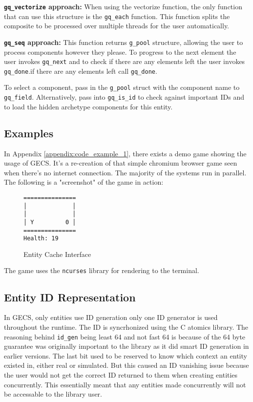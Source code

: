 \textbf{\texttt{gq\_vectorize} approach:} When using the vectorize function, the only function that can use this structure is the \texttt{gq\_each} function. This function splits the composite to be processed over multiple threads for the user automatically.

\textbf{\texttt{gq\_seq} approach:} This function returns \texttt{g\_pool} structure, allowing the user to process components however they please. To progress to the next element the user invokes \texttt{gq\_next} and to check if there are any elements left the user invokes \texttt{gq\_done}.if there are any elements left call \texttt{gq\_done}.

To select a component, pass in the \texttt{g\_pool} struct with the component name to \texttt{gq\_field}. Alternatively, pass into \texttt{gq\_is\_id} to check against important IDs and to load the hidden archetype components for this entity. 

\subsection{Examples}
In Appendix \ref{appendix:code_example_1}, there exists a demo game showing the usage of GECS. It's a re-creation of that simple chromium browser game seen when there's no internet connection. The majority of the systems run in parallel. The following is a "screenshot" of the game in action:

\begin{figure}[H]
    \begin{verbatim}
===============
│             │
│             │
│ Y         0 │
===============
Health: 19
    \end{verbatim}
\caption{Entity Cache Interface}
\label{code:component_retrieval}
\end{figure}

The game uses the \texttt{ncurses} library for rendering to the terminal. 

\subsection{Entity ID Representation}
In GECS, only entities use ID generation only one ID generator is used throughout the runtime. The ID is syncrhonized using the C atomics library. The reasoning behind \texttt{id\_gen} being least 64 and not fast 64 is because of the 64 byte guarantee was originally important to the library as it did smart ID generation in earlier versions. The last bit used to be reserved to know which context an entity existed in, either real or simulated. But this caused an ID vanishing issue because the user would not get the correct ID returned to them when creating entities concurrently. This essentially meant that any entities made concurrently will not be accessable to the library user.

